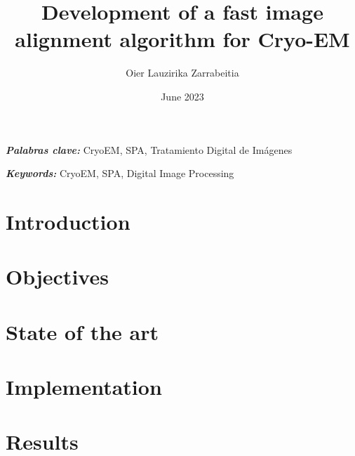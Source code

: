\documentclass{etsit-report}
\title{Development of a fast image alignment algorithm for Cryo-EM}
\author{Oier Lauzirika Zarrabeitia}
\date{June 2023}
\begin{document}
\frontmatter

\cleardoublepage
\makefrontpage

\cleardoublepage
\makeinfopage

\cleardoublepage
\maketitle

\begin{otherlanguage}{spanish}
\begin{abstract}
    
\end{abstract}
\textit{\textbf{Palabras clave:}}
CryoEM, SPA, Tratamiento Digital de Imágenes
\end{otherlanguage}

\begin{abstract}
    
\end{abstract}
\textit{\textbf{Keywords: }}
CryoEM, SPA, Digital Image Processing

\newpage
\tableofcontents
\listoffigures
\listoftables
\lstlistoflistings

\printglossary[type=\acronymtype]

\mainmatter

\chapter{Introduction}
\label{chap:introduction}


\chapter{Objectives}
\label{chap:objetives}


\chapter{State of the art}
\label{chap:state_of_the_art}


\chapter{Implementation}
\label{chap:implementation}


\chapter{Results}
\label{chap:results}

\end{document}
